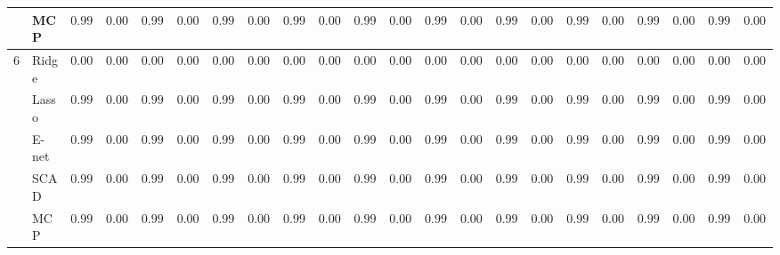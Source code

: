 \begin{tabular}{p{0.2cm}p{1cm}|p{0.6cm}p{0.6cm}|p{0.6cm}p{0.6cm}p{0.6cm}p{0.6cm}p{0.6cm}p{0.6cm}|p{0.6cm}p{0.6cm}p{0.6cm}p{0.6cm}p{0.6cm}p{0.6cm}|p{0.6cm}p{0.6cm}p{0.6cm}p{0.6cm}p{0.6cm}p{0.6cm}}
 & MCP  & $0.9970$ & $0.0027$ & $0.9960$ & $0.0023$ & $0.9973$ & $0.0012$ & $0.9993$ & $0.0002$ & $0.9968$ & $0.0025$ & $0.9973$ & $0.0022$ & $0.9980$ & $0.0021$ & $0.9970$ & $0.0020$ & $0.9971$ & $0.0016$ & $0.9987$ & $0.0011$ \\\hline
6 & Ridge  & $0.0000$ & $0.0000$ & $0.0000$ & $0.0000$ & $0.0000$ & $0.0000$ & $0.0000$ & $0.0000$ & $0.0000$ & $0.0000$ & $0.0000$ & $0.0000$ & $0.0000$ & $0.0000$ & $0.0000$ & $0.0000$ & $0.0000$ & $0.0000$ & $0.0000$ & $0.0000$ \\
 & Lasso  & $0.9995$ & $0.0000$ & $0.9995$ & $0.0000$ & $0.9993$ & $0.0005$ & $0.9977$ & $0.0015$ & $0.9995$ & $0.0000$ & $0.9995$ & $0.0000$ & $0.9994$ & $0.0002$ & $0.9995$ & $0.0000$ & $0.9995$ & $0.0001$ & $0.9988$ & $0.0009$ \\
 & E-net  & $0.9995$ & $0.0000$ & $0.9995$ & $0.0000$ & $0.9992$ & $0.0007$ & $0.9964$ & $0.0024$ & $0.9995$ & $0.0000$ & $0.9995$ & $0.0000$ & $0.9992$ & $0.0003$ & $0.9995$ & $0.0000$ & $0.9995$ & $0.0001$ & $0.9982$ & $0.0013$ \\
 & SCAD  & $0.9970$ & $0.0043$ & $0.9956$ & $0.0043$ & $0.9964$ & $0.0031$ & $0.9969$ & $0.0032$ & $0.9960$ & $0.0060$ & $0.9970$ & $0.0045$ & $0.9979$ & $0.0029$ & $0.9970$ & $0.0034$ & $0.9975$ & $0.0029$ & $0.9982$ & $0.0020$ \\
 & MCP  & $0.9985$ & $0.0022$ & $0.9982$ & $0.0018$ & $0.9988$ & $0.0010$ & $0.9992$ & $0.0003$ & $0.9985$ & $0.0019$ & $0.9989$ & $0.0011$ & $0.9990$ & $0.0010$ & $0.9989$ & $0.0013$ & $0.9989$ & $0.0011$ & $0.9990$ & $0.0009$ \\
\hline 
\end{tabular}

